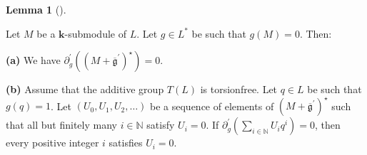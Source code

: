 \documentclass[numbers=enddot,12pt,final,onecolumn,notitlepage]{scrartcl}%
\theoremstyle{definition}
\newtheorem{lem}[theo]{Lemma}
\newenvironment{lemma}[1][]
{\begin{lem}[#1]\begin{leftbar}}
{\end{leftbar}\end{lem}}
\let\sumnonlimits\sum
\renewcommand{\sum}{\sumnonlimits\limits}
\begin{document}
\begin{lemma}
\label{lem.Kert'.deriv0}Let $M$ be a $\mathbf{k}$-submodule of $L$. Let $g\in
L^{\ast}$ be such that $g\left(  M\right)  =0$. Then: \medskip

\textbf{(a)} We have $\partial_{g}^{\prime}\left(  \left(  M+\overline
{\mathfrak{g}}^{\prime}\right)  ^{\star}\right)  =0$. \medskip

\textbf{(b)} Assume that the additive group $T\left(  L\right)  $ is
torsionfree. Let $q\in L$ be such that $g\left(  q\right)  =1$. Let $\left(
U_{0},U_{1},U_{2},\ldots\right)  $ be a sequence of elements of $\left(
M+\overline{\mathfrak{g}}^{\prime}\right)  ^{\star}$ such that all but
finitely many $i\in\mathbb{N}$ satisfy $U_{i}=0$. If $\partial_{g}^{\prime
}\left(  \sum_{i\in\mathbb{N}}U_{i}q^{i}\right)  =0$, then every positive
integer $i$ satisfies $U_{i}=0$.
\end{lemma}
\end{document}
